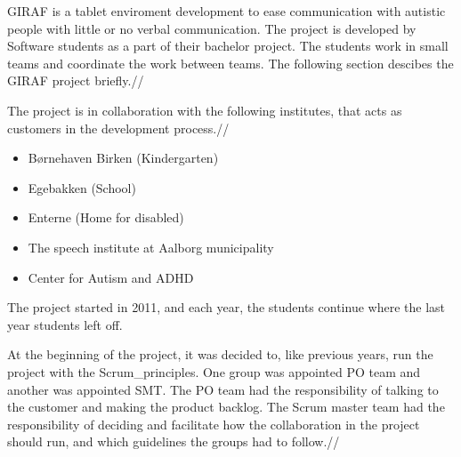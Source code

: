 GIRAF is a tablet enviroment development to ease communication with autistic people with little or no verbal communication. The project is developed by Software students as a part of their bachelor project. The students work in small teams and coordinate the work between teams. The following section descibes the GIRAF project briefly.//

The project is in collaboration with the following institutes\cite{GirafWebsite}, that acts as customers in the development process.//

\begin{itemize}
    \item Børnehaven Birken (Kindergarten) \cite{bhBirken}
    \item Egebakken (School) \cite{egebakken}
    \item Enterne (Home for disabled) \cite{enterne}
    \item The speech institute at Aalborg municipality
    \item Center for Autism and ADHD \cite{center_for_autism}
\end{itemize}

The project started in 2011, and each year, the students continue where the last year students left off.

At the beginning of the project, it was decided to, like previous years, run the project with the \gls{Scrum_principles}. One group was appointed \gls{PO} team and another was appointed \gls{SMT}. The \gls{PO} team had the responsibility of talking to the customer and making the product backlog. The Scrum master team had the responsibility of deciding and facilitate how the collaboration in the project should run, and which guidelines the groups had to follow.//